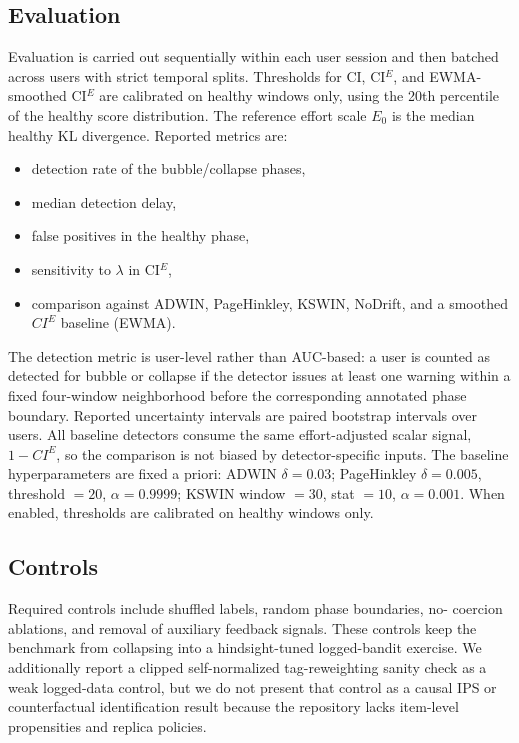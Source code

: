 \subsection*{Evaluation}
Evaluation is carried out sequentially within each user session and then
batched across users with strict temporal splits. Thresholds for CI,
CI$^E$, and EWMA-smoothed CI$^E$ are calibrated on healthy windows only,
using the 20th percentile of the healthy score distribution. The reference
effort scale $E_0$ is the median healthy KL divergence. Reported metrics are:
\begin{itemize}[leftmargin=*]
  \item detection rate of the bubble/collapse phases,
  \item median detection delay,
  \item false positives in the healthy phase,
  \item sensitivity to $\lambda$ in CI$^E$,
  \item comparison against ADWIN, PageHinkley, KSWIN, NoDrift, and a
    smoothed $CI^E$ baseline (EWMA).
\end{itemize}
The detection metric is user-level rather than AUC-based: a user is counted as
detected for bubble or collapse if the detector issues at least one warning
within a fixed four-window neighborhood before the corresponding annotated phase
boundary. Reported uncertainty intervals are paired bootstrap intervals over
users.
All baseline detectors consume the same effort-adjusted scalar signal,
$1 - CI^E$, so the comparison is not biased by detector-specific
inputs. The baseline hyperparameters are fixed a priori: ADWIN $\delta = 0.03$;
PageHinkley $\delta = 0.005$, threshold $= 20$, $\alpha = 0.9999$; KSWIN
window $= 30$, stat $= 10$, $\alpha = 0.001$. When enabled, thresholds are
calibrated on healthy windows only.

\subsection*{Controls}
Required controls include shuffled labels, random phase boundaries, no-
coercion ablations, and removal of auxiliary feedback signals. These controls
keep the benchmark from collapsing into a hindsight-tuned logged-bandit
exercise. We additionally report a clipped self-normalized tag-reweighting
sanity check as a weak logged-data control, but we do not present that control
as a causal IPS or counterfactual identification result because the repository
lacks item-level propensities and replica policies.
